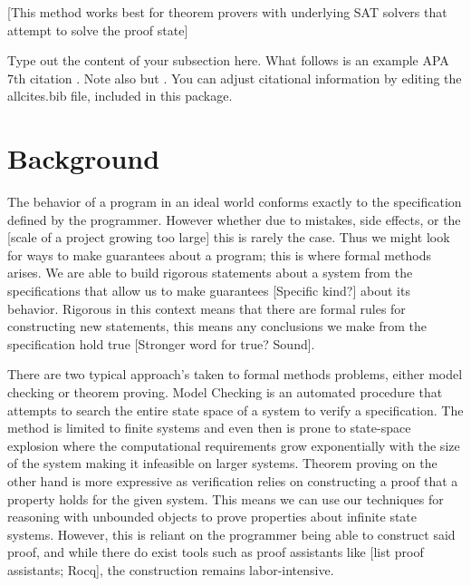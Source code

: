 [This method works best for theorem provers with underlying SAT solvers that attempt to solve the proof state]

Type out the content of your subsection here. What follows is an example APA 7th citation \citep{Met78}. Note also \citet{Met78b} but \citet{Met78c}. You can adjust citational information by editing the allcites.bib file, included in this package.

\section{Background}
The behavior of a program in an ideal world conforms exactly to the specification defined by the programmer. However whether due to mistakes, side effects, or the [scale of a project growing too large] this is rarely the case. 
Thus we might look for ways to make guarantees about a program; this is where formal methods arises. We are able to build rigorous statements about a system from the specifications that allow us to make guarantees [Specific kind?]
about its behavior. Rigorous in this context means that there are formal rules for constructing new statements, this means any conclusions we make from the specification hold true [Stronger word for true? Sound]. 

There are two typical approach's taken to formal methods problems, either model checking or theorem proving. Model Checking is an automated procedure that attempts to search the entire state space of a system to verify a specification.
The method is limited to finite systems and even then is prone to state-space explosion where the computational requirements grow exponentially with the size of the system making it infeasible on larger systems. Theorem proving on the
other hand is more expressive as verification relies on constructing a proof that a property holds for the given system. This means we can use our techniques for reasoning with unbounded objects to prove properties about infinite state systems.
However, this is reliant on the programmer being able to construct said proof, and while there do exist tools such as proof assistants like [list proof assistants; Rocq], the construction remains labor-intensive.

